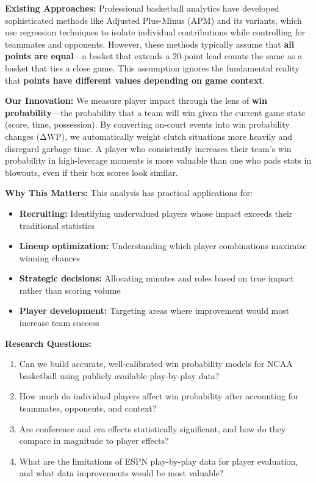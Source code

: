 \documentclass[
  letterpaper,
  DIV=11,
  numbers=noendperiod]{scrartcl}
\providecommand{\tightlist}{%
  \setlength{\itemsep}{0pt}\setlength{\parskip}{0pt}}
\begin{document}
\textbf{Existing Approaches:} Professional basketball analytics have
developed sophisticated methods like Adjusted Plus-Minus (APM) and its
variants, which use regression techniques to isolate individual
contributions while controlling for teammates and opponents. However,
these methods typically assume that \textbf{all points are equal}---a
basket that extends a 20-point lead counts the same as a basket that
ties a close game. This assumption ignores the fundamental reality that
\textbf{points have different values depending on game context}.

\textbf{Our Innovation:} We measure player impact through the lens of
\textbf{win probability}---the probability that a team will win given
the current game state (score, time, possession). By converting on-court
events into win probability changes (ΔWP), we automatically weight
clutch situations more heavily and disregard garbage time. A player who
consistently increases their team's win probability in high-leverage
moments is more valuable than one who pads stats in blowouts, even if
their box scores look similar.

\textbf{Why This Matters:} This analysis has practical applications for:

\begin{itemize}
\tightlist
\item
  \textbf{Recruiting:} Identifying undervalued players whose impact
  exceeds their traditional statistics
\item
  \textbf{Lineup optimization:} Understanding which player combinations
  maximize winning chances
\item
  \textbf{Strategic decisions:} Allocating minutes and roles based on
  true impact rather than scoring volume
\item
  \textbf{Player development:} Targeting areas where improvement would
  most increase team success
\end{itemize}

\textbf{Research Questions:}

\begin{enumerate}
\def\labelenumi{\arabic{enumi}.}
\tightlist
\item
  Can we build accurate, well-calibrated win probability models for NCAA
  basketball using publicly available play-by-play data?
\item
  How much do individual players affect win probability after accounting
  for teammates, opponents, and context?
\item
  Are conference and era effects statistically significant, and how do
  they compare in magnitude to player effects?
\item
  What are the limitations of ESPN play-by-play data for player
  evaluation, and what data improvements would be most valuable?
\end{enumerate}
\end{document}
